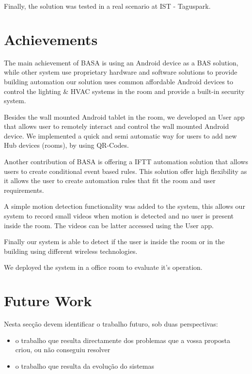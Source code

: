 Finally, the solution was tested in a real scenario  at IST - Taguspark.


\section{Achievements}
\label{section:achievements}

The main achievement of BASA is using an Android device as a \ac{BAS} solution, while other system use proprietary hardware and software solutions to provide building automation our solution uses common affordable Android devices to control the lighting \& \ac{HVAC} systems in the room and provide a built-in security system. 

Besides the wall mounted Android tablet in the room, we developed an User app that allows user to remotely interact and control the wall mounted Android device. We implemented a quick and semi automatic way for users to add new Hub devices (rooms), by using QR-Codes.


Another contribution of BASA is offering a \ac{IFTT} automation solution that allows users to create conditional event based rules. This solution offer high flexibility as it allows the user to create automation rules that fit the room and user requirements.

A simple motion detection functionality was added to the system, this allows our system to record small videos when motion is detected and no user is present inside the room. The videos can be latter accessed using the User app.

Finally our system is able to detect if the user is inside the room or in the building using different wireless technologies.


We deployed the system in a office room to evaluate it's operation. 






\section{Future Work}
\label{section:future}
Nesta secção devem identificar o trabalho futuro, sob duas perspectivas:
\begin{itemize}
\item o trabalho que resulta directamente dos problemas que a vossa proposta criou, ou não conseguiu resolver
\item o trabalho que resulta da evolução do sistemas
\end{itemize}


\cleardoublepage
